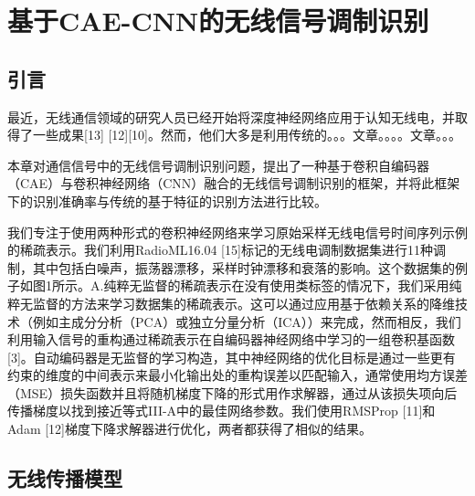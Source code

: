 \chapter{基于CAE-CNN的无线信号调制识别}
\section{引言}
最近，无线通信领域的研究人员已经开始将深度神经网络应用于认知无线电，并取得了一些成果[13] [12][10]。然而，他们大多是利用传统的。。。文章。。。。文章。。。\par

本章对通信信号中的无线信号调制识别问题，提出了一种基于卷积自编码器（CAE）与卷积神经网络（CNN）融合的无线信号调制识别的框架，并将此框架下的识别准确率与传统的基于特征的识别方法进行比较。

我们专注于使用两种形式的卷积神经网络来学习原始采样无线电信号时间序列示例的稀疏表示。我们利用RadioML16.04 [15]标记的无线电调制数据集进行11种调制，其中包括白噪声，振荡器漂移，采样时钟漂移和衰落的影响。这个数据集的例子如图1所示。A.纯粹无监督的稀疏表示在没有使用类标签的情况下，我们采用纯粹无监督的方法来学习数据集的稀疏表示。这可以通过应用基于依赖关系的降维技术（例如主成分分析（PCA）或独立分量分析（ICA））来完成，然而相反，我们利用输入信号的重构通过稀疏表示在自编码器神经网络中学习的一组卷积基函数[3]。自动编码器是无监督的学习构造，其中神经网络的优化目标是通过一些更有约束的维度的中间表示来最小化输出处的重构误差以匹配输入，通常使用均方误差（MSE）损失函数并且将随机梯度下降的形式用作求解器，通过从该损失项向后传播梯度以找到接近等式III-A中的最佳网络参数。我们使用RMSProp [11]和Adam [12]梯度下降求解器进行优化，两者都获得了相似的结果。\par


\section{无线传播模型}

